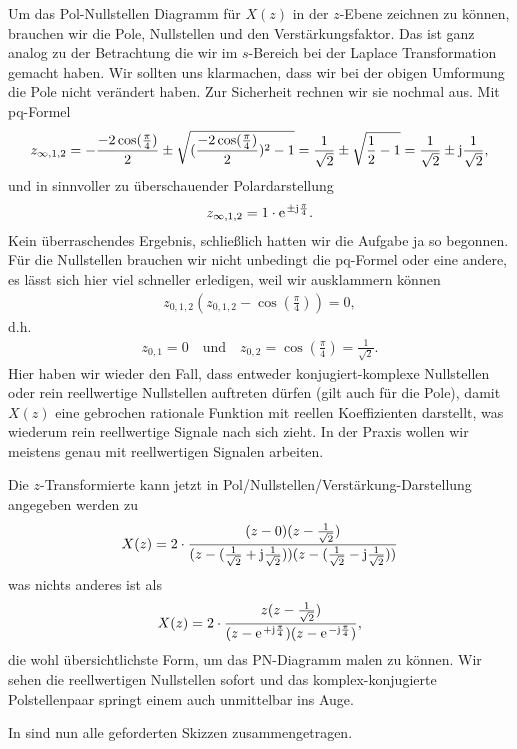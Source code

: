 \begin{ExCalc}
Um das Pol-Nullstellen Diagramm für $X(z)$ in der $z$-Ebene zeichnen zu können,
brauchen wir  die Pole, Nullstellen und den Verstärkungsfaktor.
Das ist ganz analog zu der Betrachtung die wir im $s$-Bereich bei der Laplace
Transformation gemacht haben.
%
Wir sollten uns klarmachen, dass wir bei der obigen Umformung die Pole nicht
verändert haben. Zur Sicherheit rechnen wir sie nochmal aus. Mit pq-Formel
\begin{align}
z_{\infty,1,2} = -\frac{-2\cos(\frac{\pi}{4})}{2} \pm \sqrt{(\frac{-2 \cos(\frac{\pi}{4})}{2})^2-1}
=
\frac{1}{\sqrt{2}} \pm \sqrt{\frac{1}{2}-1}
=
\frac{1}{\sqrt{2}} \pm \im \frac{1}{\sqrt{2}},
\end{align}
und in sinnvoller zu überschauender Polardarstellung
\begin{align}
z_{\infty,1,2} = 1 \cdot \e^{\pm \im \frac{\pi}{4}}.
\end{align}
Kein überraschendes Ergebnis, schließlich hatten wir die Aufgabe ja so begonnen.
%
Für die Nullstellen brauchen wir nicht unbedingt die pq-Formel oder eine andere,
es lässt sich hier viel schneller erledigen, weil wir ausklammern können
\begin{align}
z_{0,1,2} (z_{0,1,2} - \cos(\frac{\pi}{4})) = 0,
\end{align}
d.h.
\begin{align}
z_{0,1} = 0\quad \text{und} \quad z_{0,2} = \cos(\frac{\pi}{4})=\frac{1}{\sqrt{2}}.
\end{align}
Hier haben wir wieder den Fall, dass entweder konjugiert-komplexe Nullstellen
oder rein reellwertige Nullstellen auftreten dürfen (gilt auch für die Pole),
damit $X(z)$ eine gebrochen rationale Funktion mit reellen Koeffizienten
darstellt, was wiederum rein reellwertige Signale nach sich zieht. In der Praxis
wollen wir meistens genau mit reellwertigen Signalen arbeiten.
%

Die $z$-Transformierte kann jetzt in Pol/Nullstellen/Verstärkung-Darstellung
angegeben werden zu
\begin{align}
X(z) = 2 \cdot \frac{(z-0) (z-\frac{1}{\sqrt{2}})}{(z-(\frac{1}{\sqrt{2}} + \im \frac{1}{\sqrt{2}})) (z-(\frac{1}{\sqrt{2}} - \im \frac{1}{\sqrt{2}}))}
\end{align}
was nichts anderes ist als
\begin{align}
X(z) = 2 \cdot \frac{z (z-\frac{1}{\sqrt{2}})}{(z-\e^{+ \im \frac{\pi}{4}})(z-\e^{-\im \frac{\pi}{4}})},
\end{align}
die wohl übersichtlichste Form, um das PN-Diagramm malen zu können. Wir sehen
die reellwertigen Nullstellen sofort und das komplex-konjugierte Polstellenpaar
springt einem auch unmittelbar ins Auge.
%
\end{ExCalc}
\begin{Loesung}
In  sind nun alle geforderten Skizzen zusammengetragen.
\end{Loesung}



